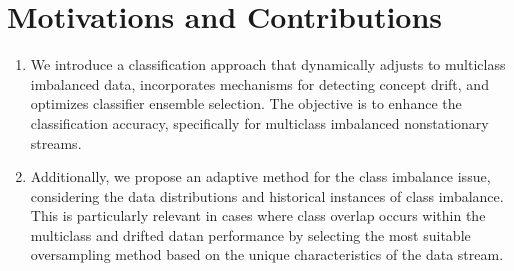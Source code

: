   \section{Motivations and Contributions} \label{sec:4_2_motivation}
  \begin{enumerate}[nosep]
    \item We introduce a classification approach that dynamically adjusts to multiclass imbalanced data, incorporates mechanisms for
    detecting concept drift, and optimizes classifier ensemble selection. The objective is to enhance the classification accuracy, specifically for multiclass imbalanced nonstationary streams.
   \item Additionally, we propose an adaptive method for the class imbalance issue, considering the data distributions and historical instances of class imbalance. This is particularly relevant in cases where class overlap occurs within the multiclass and drifted datan performance by selecting the most suitable oversampling method based on the unique characteristics of the data stream. 
    \end{enumerate}